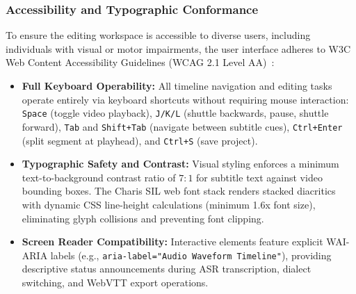 \documentclass[conference]{IEEEtran}
\begin{document}
\subsubsection{Accessibility and Typographic Conformance}
\label{sec:design:gov:accessibility}
To ensure the editing workspace is accessible to diverse users, including individuals with visual or motor impairments, the user interface adheres to W3C Web Content Accessibility Guidelines (WCAG 2.1 Level AA)~\cite{norman1986user}:
\begin{itemize}
    \item \textbf{Full Keyboard Operability:} All timeline navigation and editing tasks operate entirely via keyboard shortcuts without requiring mouse interaction: \texttt{Space} (toggle video playback), \texttt{J/K/L} (shuttle backwards, pause, shuttle forward), \texttt{Tab} and \texttt{Shift+Tab} (navigate between subtitle cues), \texttt{Ctrl+Enter} (split segment at playhead), and \texttt{Ctrl+S} (save project).
    \item \textbf{Typographic Safety and Contrast:} Visual styling enforces a minimum text-to-background contrast ratio of $7:1$ for subtitle text against video bounding boxes. The Charis SIL web font stack renders stacked diacritics with dynamic CSS line-height calculations (minimum 1.6x font size), eliminating glyph collisions and preventing font clipping.
    \item \textbf{Screen Reader Compatibility:} Interactive elements feature explicit WAI-ARIA labels (e.g., \texttt{aria-label="Audio Waveform Timeline"}), providing descriptive status announcements during ASR transcription, dialect switching, and WebVTT export operations.
\end{itemize}
\end{document}
